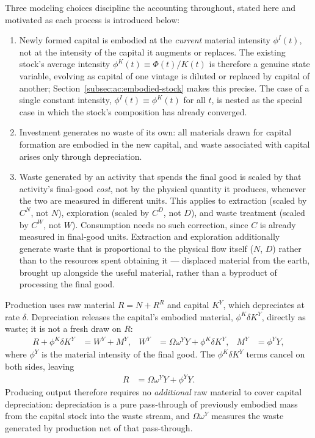 Three modeling choices discipline the accounting throughout, stated here and motivated as each process is introduced below:
\begin{enumerate}[label=(\arabic*),leftmargin=2.4em]
\item Newly formed capital is embodied at the \emph{current} material intensity $\phi^I(t)$, not at the intensity of the capital it augments or replaces. The existing stock's average intensity $\phi^K(t)\equiv\Phi(t)/K(t)$ is therefore a genuine state variable, evolving as capital of one vintage is diluted or replaced by capital of another; Section~\ref{subsec:ac:embodied-stock} makes this precise. The case of a single constant intensity, $\phi^I(t)\equiv\phi^K(t)$ for all $t$, is nested as the special case in which the stock's composition has already converged.
\item Investment generates no waste of its own: all materials drawn for capital formation are embodied in the new capital, and waste associated with capital arises only through depreciation.
\item Waste generated by an activity that spends the final good is scaled by that activity's final-good \emph{cost}, not by the physical quantity it produces, whenever the two are measured in different units. This applies to extraction (scaled by $C^N$, not $N$), exploration (scaled by $C^D$, not $D$), and waste treatment (scaled by $C^W$, not $W$). Consumption needs no such correction, since $C$ is already measured in final-good units. Extraction and exploration additionally generate waste that is proportional to the physical flow itself ($N$, $D$) rather than to the resources spent obtaining it --- displaced material from the earth, brought up alongside the useful material, rather than a byproduct of processing the final good.
\end{enumerate}

 Production uses raw material $R=N+R^R$ and capital $K^Y$, which depreciates at rate $\delta$. Depreciation releases the capital's embodied material, $\phi^K\delta K^Y$, directly as waste; it is not a fresh draw on $R$:
\begin{align}
R+\phi^K\delta K^Y &= W^Y+M^Y, &
W^Y &= \Omega\omega^YY+\phi^K\delta K^Y, &
M^Y &= \phi^YY,
\label{eq:ac:production}
\end{align}
where $\phi^Y$ is the material intensity of the final good. The $\phi^K\delta K^Y$ terms cancel on both sides, leaving
\begin{align}
R &= \Omega\omega^YY+\phi^YY.
\label{eq:ac:production-reduced}
\end{align}
Producing output therefore requires no \emph{additional} raw material to cover capital depreciation: depreciation is a pure pass-through of previously embodied mass from the capital stock into the waste stream, and $\Omega\omega^Y$ measures the waste generated by production net of that pass-through.

